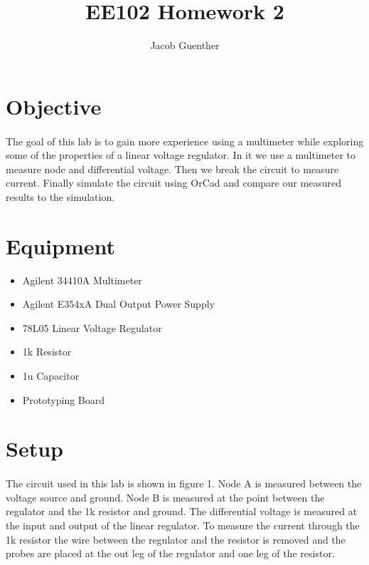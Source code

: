 \documentclass{article}
\title{EE102 Homework 2}
\author{Jacob Guenther}
\begin{document}


\section{Objective}
\paragraph{}
The goal of this lab is to gain more experience using a multimeter while exploring some of the properties of a linear voltage regulator. In it we use a multimeter to measure node and differential voltage. Then we break the circuit to measure current. Finally simulate the circuit using OrCad and compare our measured results to the simulation.

\section{Equipment}
\begin{itemize}
	\item Agilent 34410A Multimeter
	\item Agilent E354xA Dual Output Power Supply
	\item 78L05 Linear Voltage Regulator
	\item 1k Resistor
	\item 1u Capacitor
	\item Prototyping Board
\end{itemize}

\section{Setup}
\paragraph{}
The circuit used in this lab is shown in figure 1. Node A is measured between the voltage source and ground. Node B is measured at the point between the regulator and the 1k resistor and ground. The differential voltage is measured at the input and output of the linear regulator. To measure the current through the 1k resistor the wire between the regulator and the resistor is removed and the probes are placed at the out leg of the regulator and one leg of the resistor.
\end{document}
